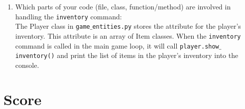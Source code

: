 \documentclass[11pt]{article}
\begin{document}
\begin{enumerate}
    \item Which parts of your code (file, class, function/method) are involved in handling the \texttt{inventory} command:\\
    The Player class in \texttt{game$\_$entities.py} stores the attribute for the player's inventory. This attribute is an array of Item classes. When the \texttt{inventory} command is called in the main game loop, it will call  \texttt{player.show$\_$inventory()} and print the list of items in the player's inventory into the console.
\end{enumerate}

\section*{Score}
\begin{enumerate}


\end{enumerate}
\end{document}

